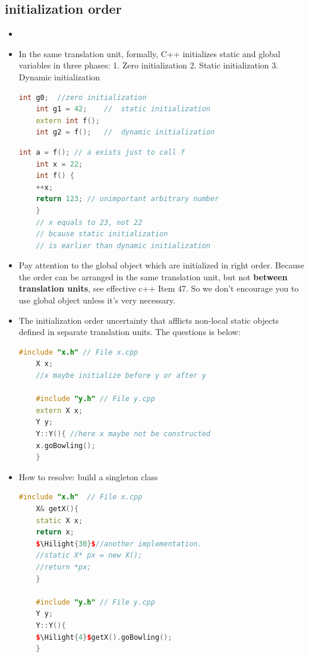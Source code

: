 \documentclass[a4paper,12pt,twoside]{book}
\newcommand{\Hilight}[1]{\makebox[0pt][l]{\color{yellow}\rule[-3pt]{#1em}{11pt}}}
\begin{document}
\subsection{initialization order}
\begin{itemize}
	\item \item In the same translation unit, formally, C++ initializes static and global variables in three phases: 1. Zero initialization 2. Static initialization 3. Dynamic initialization
	
	\begin{lstlisting}[frame=single, language=c++, mathescape=true]
	int g0;  //zero initialization
	int g1 = 42;    //  static initialization
	extern int f();
	int g2 = f();   //  dynamic initialization
	\end{lstlisting}
	
	\begin{lstlisting}[frame=single, language=c++, mathescape=true]
	int a = f(); // a exists just to call f
	int x = 22;
	int f() {
	++x;
	return 123; // unimportant arbitrary number
	}
	// x equals to 23, not 22
	// bcause static initialization
	// is earlier than dynamic initialization
	\end{lstlisting}
	
	\item Pay attention to the global object which are initialized in right order. Because the order can be arranged in the same translation unit, but not \textbf{between translation units}, see effective c++ Item 47. So we don't encourage you to use global object unless it's very necessary.
	
	\item The initialization order uncertainty that afflicts non-local static objects defined in separate translation units. The questions is below:
	
	\begin{lstlisting}[frame=single, language=c++]
	#include "x.h" // File x.cpp
	X x;
	//x maybe initialize before y or after y
	
	#include "y.h" // File y.cpp
	extern X x;
	Y y;
	Y::Y(){ //here x maybe not be constructed
	x.goBowling();
	}
	\end{lstlisting}
	
	\item  How to resolve: build a singleton class
	\begin{lstlisting}[frame=single, language=c++, mathescape=true]
	#include "x.h"  // File x.cpp
	X& getX(){
	static X x;
	return x;
	$\Hilight{30}$//another implementation.
	//static X* px = new X();
	//return *px;
	}
	
	#include "y.h" // File y.cpp
	Y y;
	Y::Y(){
	$\Hilight{4}$getX().goBowling();
	}
	\end{lstlisting}
\end{itemize}
\end{document}
